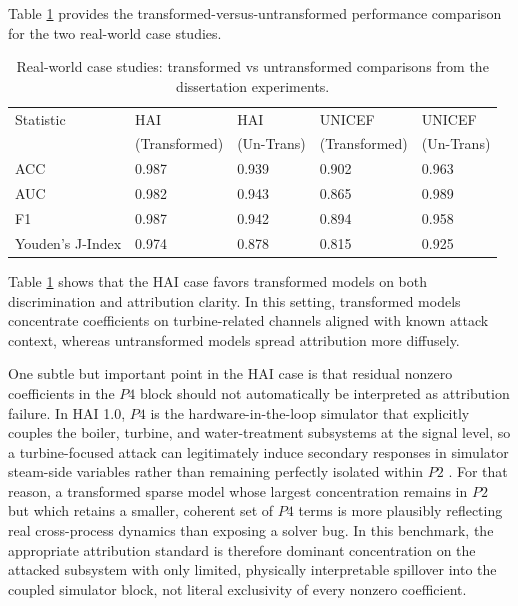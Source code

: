Table \ref{tab:rw_results} provides the transformed-versus-untransformed performance comparison for the two real-world case studies.

\begin{table}[H]
    \caption[Real-world transformed vs. untransformed results.]{Real-world case studies: transformed vs untransformed comparisons from the dissertation experiments.}
    \label{tab:rw_results}
    \begin{center}
        \begin{tabular}{lllll}
            Statistic        & HAI           & HAI        & UNICEF        & UNICEF     \\
                             & (Transformed) & (Un-Trans) & (Transformed) & (Un-Trans) \\ \hline
            ACC              & 0.987         & 0.939      & 0.902         & 0.963      \\ \hline
            AUC              & 0.982         & 0.943      & 0.865         & 0.989      \\ \hline
            F1               & 0.987         & 0.942      & 0.894         & 0.958      \\ \hline
            Youden's J-Index & 0.974         & 0.878      & 0.815         & 0.925      \\ \hline
        \end{tabular}
    \end{center}
\end{table}

Table \ref{tab:rw_results} shows that the HAI case favors transformed models on both discrimination and attribution clarity. In this setting, transformed models concentrate coefficients on turbine-related channels aligned with known attack context, whereas untransformed models spread attribution more diffusely.

One subtle but important point in the HAI case is that residual nonzero coefficients in the $P4$ block should not automatically be interpreted as attribution failure. In HAI 1.0, $P4$ is the hardware-in-the-loop simulator that explicitly couples the boiler, turbine, and water-treatment subsystems at the signal level, so a turbine-focused attack can legitimately induce secondary responses in simulator steam-side variables rather than remaining perfectly isolated within $P2$ \autocite{shin2020}. For that reason, a transformed sparse model whose largest concentration remains in $P2$ but which retains a smaller, coherent set of $P4$ terms is more plausibly reflecting real cross-process dynamics than exposing a solver bug. In this benchmark, the appropriate attribution standard is therefore dominant concentration on the attacked subsystem with only limited, physically interpretable spillover into the coupled simulator block, not literal exclusivity of every nonzero coefficient.

